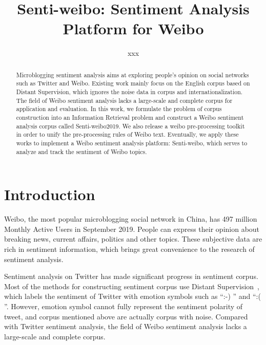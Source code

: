 \documentclass[runningheads]{llncs}
\begin{document}
%
\title{Senti-weibo: Sentiment Analysis Platform for Weibo}
%
\author{xxx}
%
%
%
\maketitle              %
%
\begin{abstract}
Microblogging sentiment analysis aims at exploring people's opinion on social networks such as Twitter and Weibo. Existing work mainly focus on the English corpus based on Distant Supervision, which ignores the noise data in corpus and internationalization. The field of Weibo sentiment analysis lacks a large-scale and complete corpus for application and evaluation. In this work, we formulate the problem of corpus construction into an Information Retrieval problem and construct a Weibo sentiment analysis corpus called Senti-weibo2019. We also release a weibo pre-processing toolkit in order to unify the pre-processing rules of Weibo text. Eventually, we apply these works to implement a Weibo sentiment analysis platform: Senti-weibo, which serves to analyze and track the sentiment of Weibo topics.


\end{abstract}

\section{Introduction}
Weibo, the most popular microblogging social network in China, has 497 million Monthly Active Users in September 2019. People can express their opinion about breaking news, current affairs, politics and other topics. These subjective data are rich in sentiment information, which brings great convenience to the research of sentiment analysis.

Sentiment analysis on Twitter has made significant progress in sentiment corpus. Most of the methods for constructing sentiment corpus use Distant Supervision~\cite{go2009twitter}, which labels the sentiment of Twitter with emotion symbols such as ``:-) '' and ``:( ''. However, emotion symbol cannot fully represent the sentiment polarity of tweet, and corpus mentioned above are actually corpus with noise. Compared with Twitter sentiment analysis, the field of Weibo sentiment analysis lacks a large-scale and complete corpus.
\end{document}
